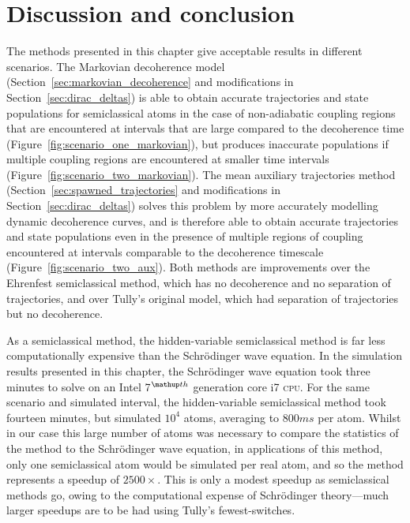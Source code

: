 
\section{Discussion and conclusion}\label{sec:HVSC_discussion}

The methods presented in this chapter give acceptable results in different scenarios. The Markovian decoherence model (Section~\ref{sec:markovian_decoherence} and modifications in Section~\ref{sec:dirac_deltas}) is able to obtain accurate trajectories and state populations for semiclassical atoms in the case of non-adiabatic coupling regions that are encountered at intervals that are large compared to the decoherence time (Figure~\ref{fig:scenario_one_markovian}), but produces inaccurate populations if multiple coupling regions are encountered at smaller time intervals (Figure~\ref{fig:scenario_two_markovian}). The mean auxiliary trajectories method (Section~\ref{sec:spawned_trajectories} and modifications in Section~\ref{sec:dirac_deltas}) solves this problem by more accurately modelling dynamic decoherence curves, and is therefore able to obtain accurate trajectories and state populations even in the presence of multiple regions of coupling encountered at intervals comparable to the decoherence timescale (Figure~\ref{fig:scenario_two_aux}). Both methods are improvements over the Ehrenfest semiclassical method, which has no decoherence and no separation of trajectories, and over Tully's original model, which had separation of trajectories but no decoherence. 

As a semiclassical method, the hidden-variable semiclassical method is far less computationally expensive than the Schr\"odinger wave equation. In the simulation results presented in this chapter, the Schr\"odinger wave equation took three minutes to solve on an Intel 7$^\up{th}$ generation core i7 \textsc{cpu}. For the same scenario and simulated interval, the hidden-variable semiclassical method took fourteen minutes, but simulated $10^4$ atoms, averaging to $800\unit{ms}$ per atom. Whilst in our case this large number of atoms was necessary to compare the statistics of the method to the Schr\"odinger wave equation, in applications of this method, only one semiclassical atom would be simulated per real atom, and so the method represents a speedup of $2500\times$. This is only a modest speedup as semiclassical methods go, owing to the computational expense of Schr\"odinger theory---much larger speedups are to be had using Tully's fewest-switches. 

